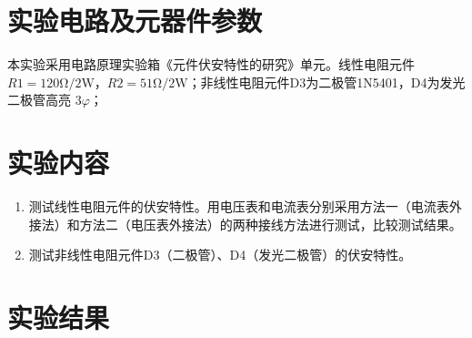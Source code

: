 \documentclass[a4paper,utf8]{article}
\begin{document}
\section{实验电路及元器件参数}
    本实验采用电路原理实验箱《元件伏安特性的研究》单元。线性电阻元件$R1=120 \unit{\ohm} / 2\unit{\W}$，$R2=51 \unit{\ohm} / 2\unit{\W}$；非线性电阻元件D3为二极管1N5401，D4为发光二极管高亮 $3\varphi$；

\section{实验内容}
    \begin{enumerate}
        \item 测试线性电阻元件的伏安特性。用电压表和电流表分别采用方法一（电流表外接法）和方法二（电压表外接法）的两种接线方法进行测试，比较测试结果。
        \item 测试非线性电阻元件D3（二极管）、D4（发光二极管）的伏安特性。
    \end{enumerate}

\section{实验结果}
\end{document}
